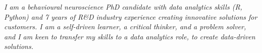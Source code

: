 
\textit{I am a behavioural neuroscience PhD candidate with data analytics skills (R, Python) and 7 years of R\&D industry experience creating innovative solutions for customers.
I am a self-driven learner, a critical thinker, and a problem solver, and I am keen to transfer my skills to a data analytics role, to create data-driven solutions.
}
